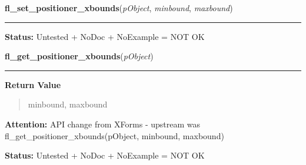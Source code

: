     \vspace{0.5ex}

\hspace{.8\funcindent}\begin{boxedminipage}{\funcwidth}

    \raggedright \textbf{fl\_set\_positioner\_xbounds}(\textit{pObject}, \textit{minbound}, \textit{maxbound})

    \vspace{-1.5ex}

    \rule{\textwidth}{0.5\fboxrule}
\setlength{\parskip}{2ex}
\setlength{\parskip}{1ex}
\textbf{Status:} Untested + NoDoc + NoExample = NOT OK



    \end{boxedminipage}

    \label{xformslib:library:fl_get_positioner_xbounds}

    \vspace{0.5ex}

\hspace{.8\funcindent}\begin{boxedminipage}{\funcwidth}

    \raggedright \textbf{fl\_get\_positioner\_xbounds}(\textit{pObject})

    \vspace{-1.5ex}

    \rule{\textwidth}{0.5\fboxrule}
\setlength{\parskip}{2ex}
\setlength{\parskip}{1ex}
      \textbf{Return Value}
    \vspace{-1ex}

      \begin{quote}
      minbound, maxbound

      \end{quote}

\textbf{Attention:} API change from XForms - upstream was fl\_get\_positioner\_xbounds(pObject,
minbound, maxbound)



\textbf{Status:} Untested + NoDoc + NoExample = NOT OK



    \end{boxedminipage}

    \label{xformslib:library:fl_set_positioner_yvalue}

